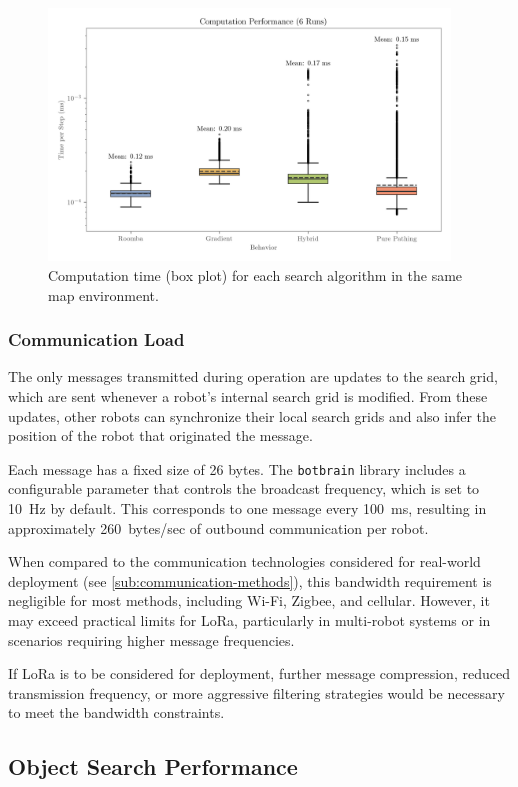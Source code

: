 \begin{figure}[H]
    \begin{center}
        \includegraphics[width=0.95\textwidth]{./figures/plots/computation-performance-(6-runs).png}
    \end{center}
    \caption{Computation time (box plot) for each search algorithm in the same map environment.}
    \label{fig:computation-performance}
\end{figure}

\subsubsection{Communication {\color{red}Load}}
The only messages transmitted during operation are updates to the search grid, which are sent whenever a robot’s internal search grid is modified. From these updates, other robots can synchronize their local search grids and also infer the position of the robot that originated the message.

Each message has a fixed size of 26 bytes. The \texttt{botbrain} library includes a configurable parameter that controls the broadcast frequency, which is set to \SI{10}{Hz} by default. This corresponds to one message every \SI{100}{ms}, resulting in approximately \SI{260}{bytes/sec} of outbound communication per robot.

When compared to the communication technologies considered for real-world deployment (see \cref{sub:communication-methods}), this bandwidth requirement is negligible for most methods, including Wi-Fi, Zigbee, and cellular. However, it may exceed practical limits for LoRa, particularly in multi-robot systems or in scenarios requiring higher message frequencies.

If LoRa is to be considered for deployment, further message compression, reduced transmission frequency, or more aggressive filtering strategies would be necessary to meet the bandwidth constraints.


\subsection{Object Search Performance}

